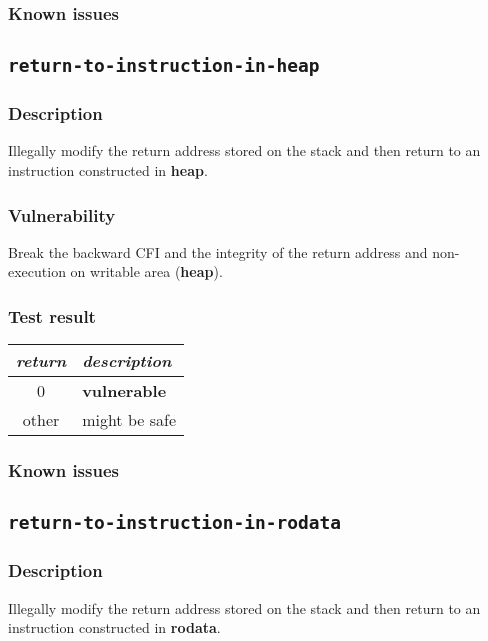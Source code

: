 \documentclass[a4paper]{book}
\begin{document}
\subsubsection{Known issues}

\newpage
\subsection{\texttt{return-to-instruction-in-heap}}\label{test-return-to-instruction-in-heap}

\subsubsection{Description}
Illegally modify the return address stored on the stack and then return to  an instruction constructed in \textbf{heap}.

\subsubsection{Vulnerability}
Break the backward CFI and the integrity of the return address and non-execution on writable area (\textbf{heap}).

\subsubsection{Test result}
\begin{tabular}{cl}
  \toprule
  \emph{return}  & \emph{description} \\
  \midrule
  0              & \textbf{vulnerable} \\
  other          & might be safe \\
  \bottomrule
\end{tabular}
  
\subsubsection{Known issues}

\newpage
\subsection{\texttt{return-to-instruction-in-rodata}}\label{test-return-to-instruction-in-rodata}

\subsubsection{Description}
Illegally modify the return address stored on the stack and then return to  an instruction constructed in \textbf{rodata}.
\end{document}
